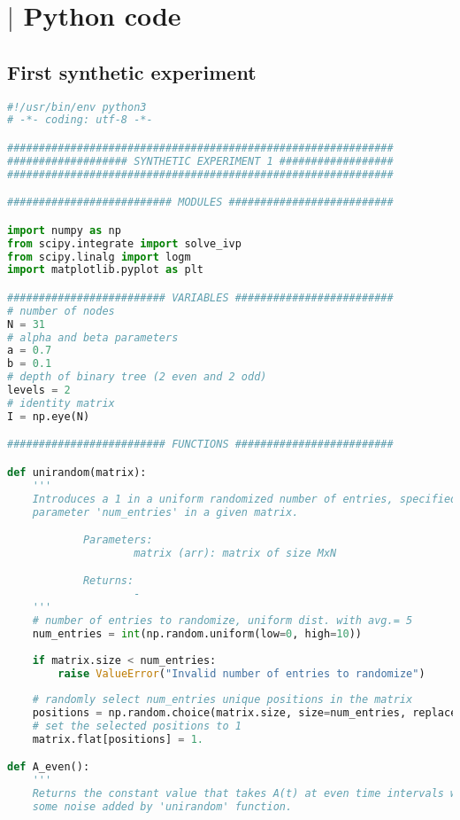 \chapter{$\vert$ Python code}
\label{chap:appa}

\section*{First synthetic experiment}

\begin{lstlisting}[language=Python, caption=First synthetic experiment]
#!/usr/bin/env python3
# -*- coding: utf-8 -*-

#############################################################
################### SYNTHETIC EXPERIMENT 1 ##################
#############################################################

########################## MODULES ##########################

import numpy as np
from scipy.integrate import solve_ivp
from scipy.linalg import logm
import matplotlib.pyplot as plt

######################### VARIABLES #########################
# number of nodes
N = 31 
# alpha and beta parameters
a = 0.7
b = 0.1
# depth of binary tree (2 even and 2 odd)
levels = 2
# identity matrix
I = np.eye(N) 

######################### FUNCTIONS #########################

def unirandom(matrix):
    '''
    Introduces a 1 in a uniform randomized number of entries, specified by the 
    parameter 'num_entries' in a given matrix.

            Parameters:
                    matrix (arr): matrix of size MxN

            Returns:
                    -
    '''
    # number of entries to randomize, uniform dist. with avg.= 5
    num_entries = int(np.random.uniform(low=0, high=10))
    
    if matrix.size < num_entries:
        raise ValueError("Invalid number of entries to randomize")
        
    # randomly select num_entries unique positions in the matrix
    positions = np.random.choice(matrix.size, size=num_entries, replace=False)
    # set the selected positions to 1
    matrix.flat[positions] = 1.

def A_even():
    '''
    Returns the constant value that takes A(t) at even time intervals with 
    some noise added by 'unirandom' function.


\end{lstlisting}
